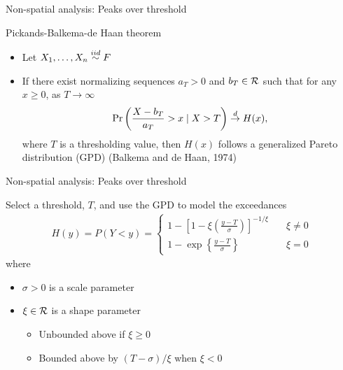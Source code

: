 \documentclass{beamer}
\begin{document}
\begin{frame}{Non-spatial analysis: Peaks over threshold}
\begin{adjustwidth}{1em}{0em}
  Pickands-Balkema-de Haan theorem \vspace{1em}
  \begin{itemize} \setlength{\itemsep}{1em}
    \item Let $X_1, \ldots, X_n \stackrel{iid}{\sim} F$
    \item If there exist normalizing sequences $a_T > 0$ and $b_T \in {\cal R}$ such that for any $x \ge 0$, as $T \rightarrow \infty$
    \begin{align*}
      \Pr\left(\frac{X - b_T}{a_T} > x \mid X > T\right) \stackrel{d}{\rightarrow} H(x),
    \end{align*}
    where $T$ is a thresholding value, then $H(x)$ follows a generalized Pareto distribution (GPD) (Balkema and de Haan, 1974)
  \end{itemize}
\end{adjustwidth}
\end{frame}

\begin{frame}{Non-spatial analysis: Peaks over threshold}
\begin{adjustwidth}{1em}{0em}
  Select a threshold, $T$, and use the GPD to model the exceedances
  \begin{align*}
    H(y) = P(Y < y) = \left\{ \begin{array}{ll}
      1 - \left[1 - \xi \left( \frac{ y - T }{ \sigma } \right) \right]^{-1 / \xi} & \quad \xi \neq 0 \\[0.5em]
      1 - \exp \left\{ \frac{ y - T }{ \sigma} \right\} & \quad \xi = 0
    \end{array}\right.
  \end{align*}
  where
  \begin{itemize} \setlength{\itemsep}{0.25em}
    \item $\sigma > 0$ is a scale parameter
    \item $\xi \in {\cal R}$ is a shape parameter
    \begin{itemize}
      \item Unbounded above if $\xi \ge 0$
      \item Bounded above by $(T - \sigma) / \xi$ when $\xi < 0$
    \end{itemize}
  \end{itemize}
\end{adjustwidth}
\end{frame}
\end{document}

